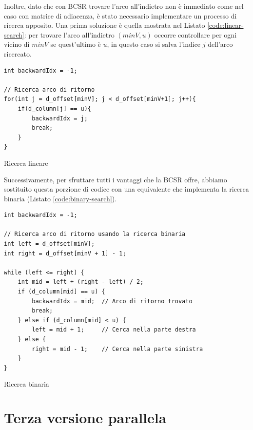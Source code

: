             Inoltre, dato che con BCSR trovare l'arco all'indietro non è immediato come nel caso con matrice di adiacenza, è stato necessario implementare un processo di ricerca apposito. Una prima soluzione è quella mostrata nel Listato \ref{code:linear-search}: per trovare l'arco all'indietro $(minV,u)$ occorre controllare per ogni vicino di $minV$ se quest'ultimo è $u$, in questo caso si salva l'indice $j$ dell'arco ricercato.
            
            \begin{listing}[h]
                \begin{verbatim}
int backwardIdx = -1;

// Ricerca arco di ritorno
for(int j = d_offset[minV]; j < d_offset[minV+1]; j++){
    if(d_column[j] == u){
        backwardIdx = j;
        break;
    }
}
                \end{verbatim}
                \caption{Ricerca lineare}\label{code:linear-search}
            \end{listing}
            
            Successivamente, per sfruttare tutti i vantaggi che la BCSR offre, abbiamo sostituito questa porzione di codice con una equivalente che implementa la ricerca binaria (Listato \ref{code:binary-search}).
            
            \begin{listing}[ht]
                \begin{verbatim}
int backwardIdx = -1;

// Ricerca arco di ritorno usando la ricerca binaria
int left = d_offset[minV];
int right = d_offset[minV + 1] - 1;

while (left <= right) {
    int mid = left + (right - left) / 2;
    if (d_column[mid] == u) {
        backwardIdx = mid;  // Arco di ritorno trovato
        break;
    } else if (d_column[mid] < u) {
        left = mid + 1;     // Cerca nella parte destra
    } else {
        right = mid - 1;    // Cerca nella parte sinistra
    }
}
                \end{verbatim}
                \caption{Ricerca binaria}\label{code:binary-search}
            \end{listing}
    
    \newpage
    \section{Terza versione parallela}


